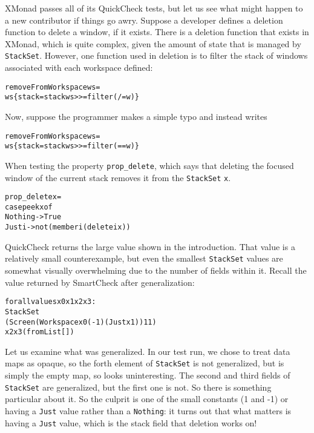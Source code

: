 \documentclass{sigplanconf}
\newenvironment{code}{\begin{alltt}\footnotesize}{\end{alltt}}
\newcommand{\ttp}[1]{\texttt{#1}}
\begin{document}
XMonad passes all of its QuickCheck tests, but let us see what might happen to a
new contributor if things go awry.  Suppose a developer defines a deletion
function to delete a window, if it exists.  There is a deletion function that
exists in XMonad, which is quite complex, given the amount of state that is managed
by \ttp{StackSet}.  However, one function used in deletion is to filter the
stack of windows associated with each workspace defined:
%
\begin{code}
removeFromWorkspace ws =
  ws \{ stack = stack ws >>= filter (/= w) \}
\end{code}
%
\noindent
Now, suppose the programmer makes a simple typo and instead writes
%
\begin{code}
removeFromWorkspace ws =
  ws \{ stack = stack ws >>= filter (== w) \}
\end{code}
%
\noindent
When testing the property \ttp{prop\_delete}, which says that deleting the
focused window of the current stack removes it from the \ttp{StackSet} \ttp{x}.
%
\begin{code}
prop_delete x =
    case peek x of
        Nothing -> True
        Just i  -> not (member i (delete i x))
\end{code}
%
\noindent
QuickCheck returns the large value shown in the introduction.  That value is a
relatively small counterexample, but even the smallest \ttp{StackSet} values are
somewhat visually overwhelming due to the number of fields within it.  Recall
the value returned by SmartCheck after generalization:
%
\begin{code}
forall values x0 x1 x2 x3:
  StackSet
    (Screen (Workspace x0 (-1) (Just x1)) 1 1)
    x2 x3 (fromList [])
\end{code}
%
\noindent
Let us examine what was generalized.  In our test run, we chose to treat data
maps as opaque, so the forth element of \ttp{StackSet} is not generalized, but
is simply the empty map, so looks uninteresting.  The second and third fields of
\ttp{StackSet} are generalized, but the first one is not.  So there is something
particular about it.  So the culprit is one of the small constants (1 and -1) or
having a \ttp{Just} value rather than a \ttp{Nothing}: it turns out that what
matters is having a \ttp{Just} value, which is the stack field that deletion
works on!


\end{document}
